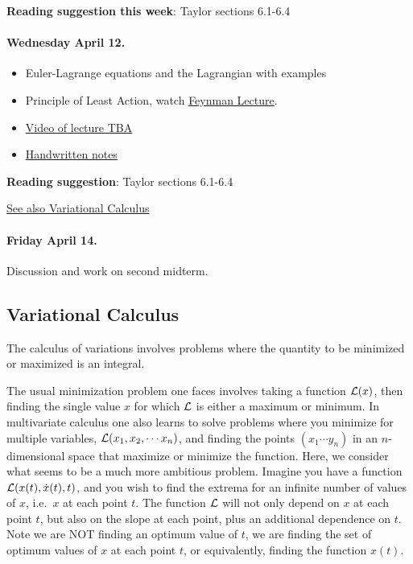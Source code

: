 \documentclass[%
oneside,                 %
final,                   %
10pt]{article}
\begin{document}
\noindent
\textbf{Reading suggestion this week}: Taylor sections 6.1-6.4

\paragraph{Wednesday April 12.}
\begin{itemize}
\item Euler-Lagrange equations and the Lagrangian with examples

\item Principle of Least Action, watch \href{{https://www.feynmanlectures.caltech.edu/II_19.html}}{Feynman Lecture}.

\item \href{{https://youtu.be/}}{Video of lecture TBA}

\item \href{{https://github.com/mhjensen/Physics321/blob/master/doc/HandWrittenNotes/Spring2023/NotesApril12.pdf}}{Handwritten notes}
\end{itemize}

\noindent
\textbf{Reading suggestion}: Taylor sections 6.1-6.4

\href{{https://en.wikipedia.org/wiki/Calculus_of_variations}}{See also Variational Calculus}

\paragraph{Friday April 14.}
Discussion and work on second midterm. 

\subsection{Variational Calculus}

The calculus of variations involves 
problems where the quantity to be minimized or maximized is an integral. 

The usual minimization problem one faces involves taking a function
${\cal L}(x)$, then finding the single value $x$ for which ${\cal L}$
is either a maximum or minimum. In multivariate calculus one also
learns to solve problems where you minimize for multiple variables,
${\cal L}(x_1,x_2,\cdots x_n)$, and finding the points $(x_1\cdots
y_n)$ in an $n$-dimensional space that maximize or minimize the
function. Here, we consider what seems to be a much more ambitious
problem. Imagine you have a function ${\cal L}(x(t),\dot{x}(t),t)$,
and you wish to find the extrema for an infinite number of values of
$x$, i.e.~$x$ at each point $t$. The function ${\cal L}$ will not only
depend on $x$ at each point $t$, but also on the slope at each point,
plus an additional dependence on $t$. Note we are NOT finding an
optimum value of $t$, we are finding the set of optimum values of $x$
at each point $t$, or equivalently, finding the function $x(t)$.
\end{document}
